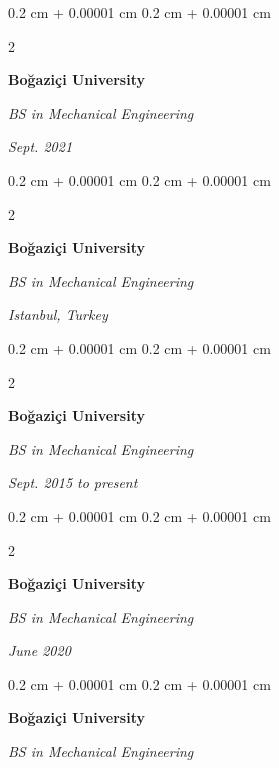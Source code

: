 \documentclass[10pt, letterpaper]{article}
\newenvironment{onecolentry}{
    \begin{adjustwidth}{
        0.2 cm + 0.00001 cm
    }{
        0.2 cm + 0.00001 cm
    }
}{
    \end{adjustwidth}
} %
\newenvironment{twocolentry}[2][]{
    \onecolentry
    \def\secondColumn{#2}
    \setcolumnwidth{\fill, 4.5 cm}
    \begin{paracol}{2}
}{
    \switchcolumn \raggedleft \secondColumn
    \end{paracol}
    \endonecolentry
} %
\begin{document}
        \vspace{0.2 cm-3px}

        \begin{twocolentry}{
            
            
        \textit{Sept. 2021}}
            \textbf{Boğaziçi University}

            \textit{BS in Mechanical Engineering}
        \end{twocolentry}



        \vspace{0.2 cm-3px}

        \begin{twocolentry}{
        \textit{Istanbul, Turkey}    
            
        }
            \textbf{Boğaziçi University}

            \textit{BS in Mechanical Engineering}
        \end{twocolentry}



        \vspace{0.2 cm-3px}

        \begin{twocolentry}{
            
            
        \textit{Sept. 2015 to present}}
            \textbf{Boğaziçi University}

            \textit{BS in Mechanical Engineering}
        \end{twocolentry}



        \vspace{0.2 cm-3px}

        \begin{twocolentry}{
            
            
        \textit{June 2020}}
            \textbf{Boğaziçi University}

            \textit{BS in Mechanical Engineering}
        \end{twocolentry}



        \vspace{0.2 cm-3px}

        \begin{onecolentry}
            \textbf{Boğaziçi University}

            \textit{BS in Mechanical Engineering}
        \end{onecolentry}
\end{document}
